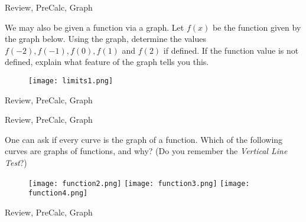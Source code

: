 \begin{tagblock}{Review, PreCalc, Graph}
\begin{question}

We may also be given a function via a graph. Let $f(x)$ be the function given by the graph below. Using the graph, determine the values $f(-2), f(-1), f(0), f(1)$ and $f(2)$ if defined.   If the function value is not defined, explain what feature of the graph tells you this.  
\begin{figure}[h]
\centering
\texttt{[image: limits1.png]}
\end{figure}
	
 

\begin{tags}
	    Review, PreCalc, Graph
\end{tags}
	
\begin{diary}
	    
\end{diary}
	
\begin{solution}
		
\end{solution}
	
\end{question}

\end{tagblock}



\begin{tagblock}{Review, PreCalc, Graph}
\begin{question}

One can ask if every curve is the graph of a function.  Which of the following curves are graphs of functions, and why?  (Do you remember the \emph{Vertical Line Test}?)

\begin{figure}[h]\texttt{[image: function2.png]} \hspace{.2in}  \texttt{[image: function3.png]} \hspace{.2in} \texttt{[image: function4.png]} \end{figure}
	
 

\begin{tags}
	    Review, PreCalc, Graph
\end{tags}
	
\begin{diary}
	    
\end{diary}
	
\begin{solution}
		
\end{solution}
	
\end{question}

\end{tagblock}

